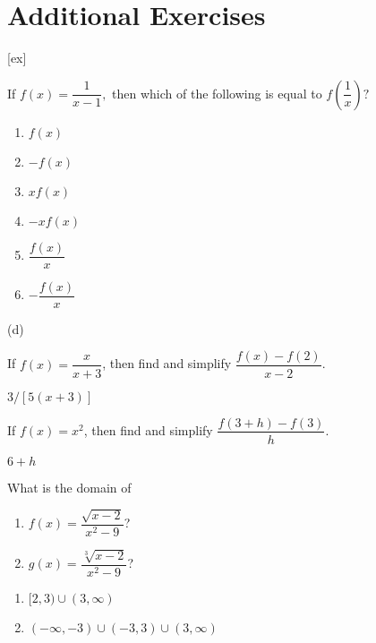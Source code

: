 \section{Additional Exercises}\label{sec:MoreFunctionExercises}

[ex]

\begin{enumialphparenastyle}

\begin{ex}
If $f\left( x\right) =\dfrac{1}{x-1},$ then which
of the following is equal to $f\left( \dfrac{1}{x}\right) ?$
\begin{enumerate}
	\item	$f(x)$
	\item	$-f(x)$
	\item	$xf(x)$
	\item	$-xf(x)$
	\item	$\dfrac{f(x)}{x}$
	\item	$-\dfrac{f(x)}{x}$
\end{enumerate}
\begin{sol}
	(d)
\end{sol}
\end{ex}


\begin{ex}
If $f(x)=\dfrac{x}{x+3}$, then find
and simplify $\dfrac{f(x)-f(2)}{x-2}$.
\begin{sol}
	$3/\left[5(x+3)\right]$
\end{sol}
\end{ex}


\begin{ex}
If $f(x)=x^2$, then find and
simplify $\dfrac{f(3+h)-f(3)}{h}$.
\begin{sol}
	$6+h$
\end{sol}
\end{ex}


\begin{ex}
What is the domain of
\begin{enumerate}
	\item	$f(x)=\dfrac{\sqrt{x-2}}{x^2-9}$?
	\item	$g(x)=\dfrac{\sqrt[3]{x-2}}{x^2-9}$?
\end{enumerate}
\begin{sol}
\begin{enumerate}
	\item	$[2,3)\cup(3,\infty)$
	\item	$(-\infty,-3)\cup(-3,3)\cup(3,\infty)$
\end{enumerate}
\end{sol}
\end{ex}



\end{enumialphparenastyle}
